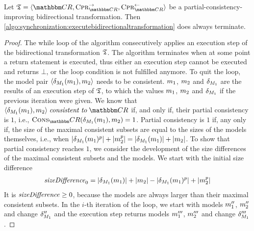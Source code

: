 \begin{lemma}
    \label{lemma:bidirectionaltransformationtermination}
    Let $\transformation{T} = \tupled{\consistencyrelationset{CR}, \consistencypreservationrule{\consistencyrelationset{CR}}^{\rightarrow}, \consistencypreservationrule{\consistencyrelationset{CR}}^{\leftarrow}}$ be a partial-consistency-improving bidirectional transformation.
    Then \autoref{algo:synchronization:executebidirectionaltransformation} does always terminate.
\end{lemma}
\begin{proof}
    The while loop of the algorithm consecutively applies an execution step of the bidirectional transformation $\mathfrak{T}$.
    The algorithm terminates when at some point a return statement is executed, thus either an execution step cannot be executed and returns $\bot$, or the loop condition is not fulfilled anymore.
    To quit the loop, the model pair $\langle \delta_{M_{1}}(m_{1}), m_{2} \rangle$ needs to be consistent.
    $m_{1}$, $m_{2}$ and $\delta_{M_{1}}$ are the results of an execution step of $\mathfrak{T}$, to which the values $m_{1}$, $m_{2}$ and $\delta_{M_{1}}$ if the previous iteration were given.
    We know that $\tupled{\change{\metamodel{M}{1}}(\model{m}{1}), \model{m}{2}} \consistenttomath \consistencyrelationset{CR}$ if, and only if, their partial consistency is $1$, i.e., $\function{Cons}_\consistencyrelationset{CR}(\change{\metamodel{M}{1}}(\model{m}{1}), \model{m}{2}) = 1$.
    Partial consistency is $1$ if, any only if, the size of the maximal consistent subsets are equal to the sizes of the models themselves, i.e., when $\lvert\delta_{M_{1}}(m_{1})^p\rvert + \lvert m_{2}^p\rvert = \lvert\delta_{M_{1}}(m_{1})\rvert + \lvert m_{2}\rvert$.
    To show that partial consistency reaches $1$, we consider the development of the size differences of the maximal consistent subsets and the models.
    We start with the initial size difference
    \begin{align*}
        \mathit{sizeDifference}_0 = \lvert\delta_{M_{1}}(m_{1})\rvert + \lvert m_{2}\rvert - \lvert\delta_{M_{1}}(m_{1})^p\rvert + \lvert m_{2}^p\rvert
    \end{align*}
    It is $\mathit{sizeDifference} \geq 0$, because the models are always larger than their maximal consistent subsets.
    In the $i$-th iteration of the loop, we start with models $m_{1}''$, $m_{2}''$ and change $\delta_{M_{1}}''$ and the execution step returns models $m_{1}'''$, $m_{2}'''$ and change $\delta_{M_{1}}'''$.

\end{proof}
